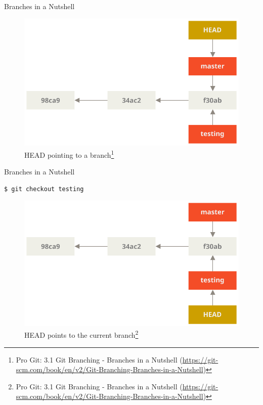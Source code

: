 \documentclass[aspectratio=169]{beamer}
\renewcommand{\footnotesize}{\tiny}
\newcommand{\sectiontitle}{}
\begin{document}
\begin{frame}{Branches in a Nutshell}{\sectiontitle}
\begin{figure}
    \centering
    \includegraphics[width=\textwidth,height=0.6\textheight,keepaspectratio]{head-to-master}
    \caption{
        HEAD pointing to a branch\footnote{
            Pro Git: 3.1 Git Branching - Branches in a Nutshell
            (\url{https://git-scm.com/book/en/v2/Git-Branching-Branches-in-a-Nutshell})
        }
    }
\end{figure}
\end{frame}

\begin{frame}[fragile]{Branches in a Nutshell}{\sectiontitle}
\begin{verbatim}
$ git checkout testing
\end{verbatim}
\begin{figure}
    \centering
    \includegraphics[width=\textwidth,height=0.5\textheight,keepaspectratio]{head-to-testing}
    \caption{
        HEAD points to the current branch\footnote{
            Pro Git: 3.1 Git Branching - Branches in a Nutshell
            (\url{https://git-scm.com/book/en/v2/Git-Branching-Branches-in-a-Nutshell})
        }
    }
\end{figure}
\end{frame}
\end{document}

